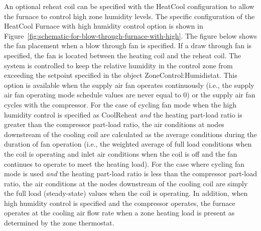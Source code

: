 An optional reheat coil can be specified with the HeatCool configuration to allow the furnace to control high zone humidity levels. The specific configuration of the HeatCool Furnace with high humidity control option is shown in Figure~\ref{fig:schematic-for-blow-through-furnace-with-high}. The figure below shows the fan placement when a blow through fan is specified. If a draw through fan is specified, the fan is located between the heating coil and the reheat coil. The system is controlled to keep the relative humidity in the control zone from exceeding the setpoint specified in the object ZoneControl:Humidistat. This option is available when the supply air fan operates continuously (i.e., the supply air fan operating mode schedule values are never equal to 0) or the supply air fan cycles with the compressor. For the case of cycling fan mode when the high humidity control is specified as CoolReheat \emph{and} the heating part-load ratio is greater than the compressor part-load ratio, the air conditions at nodes downstream of the cooling coil are calculated as the average conditions during the duration of fan operation (i.e., the weighted average of full load conditions when the coil is operating and inlet air conditions when the coil is off and the fan continues to operate to meet the heating load). For the case where cycling fan mode is used \emph{and} the heating part-load ratio is less than the compressor part-load ratio, the air conditions at the nodes downstream of the cooling coil are simply the full load (steady-state) values when the coil is operating. In addition, when high humidity control is specified and the compressor operates, the furnace operates at the cooling air flow rate when a zone heating load is present as determined by the zone thermostat.


